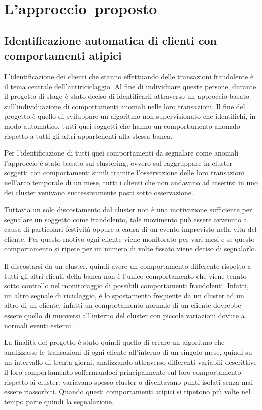 \chapter{L'approccio proposto}
\section{Identificazione automatica di clienti con comportamenti atipici}

L’identificazione dei clienti che stanno effettuando delle transazioni fraudolente è il tema centrale dell'antiriciclaggio. Al fine di individuare queste persone, durante il progetto di stage è stato deciso di identificarli attraverso un approccio basato sull'individuazione di comportamenti anomali nelle loro transazioni.
Il fine del progetto è quello di sviluppare un algoritmo non supervisionato che identifichi, in modo automatico, tutti quei soggetti che hanno un comportamento anomalo rispetto a tutti gli altri appartenenti alla stessa banca.

Per l'identificazione di tutti quei comportamenti da segnalare come anomali l'approccio è stato basato sul clustering, ovvero sul raggruppare in cluster soggetti con
comportamenti simili tramite l'osservazione delle loro transazioni nell'arco
temporale di un mese, tutti i clienti che non andavano ad inserirsi in uno dei cluster
venivano successivamente posti sotto osservazione.

Tuttavia un solo discostamento dal cluster non è una motivazione sufficiente per segnalare un soggetto come fraudolento, tale movimento può essere avvenuto a causa di particolari festività oppure a causa di un evento imprevisto nella vita del cliente.
Per questo motivo ogni cliente viene monitorato per vari mesi e se questo comportamento si ripete per un numero di volte fissato viene deciso di segnalarlo.

Il discostarsi da un cluster, quindi avere un comportamento differente rispetto a tutti gli altri clienti della banca non è l'unico comportamento che viene tenuto sotto controllo nel monitoraggio di possibili comportamenti fraudolenti.
Infatti, un altro segnale di riciclaggio, è lo spostamento frequente da un cluster ad un altro di un cliente, infatti un comportamento normale di un cliente dovrebbe essere quello di muoversi all'interno del cluster con piccole variazioni dovute a normali eventi esterni.

La finalità del progetto è stato quindi quello di creare un algoritmo che analizzasse le transazioni di ogni cliente all'interno di un singolo mese, quindi su un intervallo di trenta giorni, analizzando attraverso differenti variabili descrittive il loro comportamento soffermandoci principalmente sul loro comportamento rispetto ai cluster: variavano spesso cluster o diventavano punti isolati senza mai essere riassorbiti.
Quando questi comportamenti atipici si ripetono più volte nel tempo parte quindi la segnalazione.



